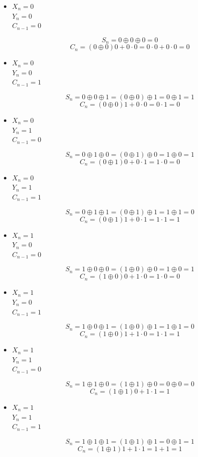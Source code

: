 \documentclass{article}
\begin{document}
\begin{itemize}
	\item
	$X_n = 0$ \\
	$Y_n = 0$ \\
	$C_{n-1} = 0$

	\[S_n = 0 \oplus 0 \oplus 0 = 0\]
	\[C_n = (0 \oplus 0)0 + 0 \cdot 0 = 0 \cdot 0 + 0 \cdot 0 = 0\]

	\item
	$X_n = 0$ \\
	$Y_n = 0$ \\
	$C_{n-1} = 1$

	\[S_n = 0 \oplus 0 \oplus 1 = (0 \oplus 0) \oplus 1 = 0 \oplus 1 = 1\]
	\[C_n = (0 \oplus 0)1 + 0 \cdot 0 = 0 \cdot 1 = 0\]

	\item
	$X_n = 0$ \\
	$Y_n = 1$ \\
	$C_{n-1} = 0$

	\[S_n = 0 \oplus 1 \oplus 0 = (0 \oplus 1) \oplus 0 = 1 \oplus 0 = 1\]
	\[C_n = (0 \oplus 1)0 + 0 \cdot 1 = 1 \cdot 0 = 0\]

	\item
	$X_n = 0$ \\
	$Y_n = 1$ \\
	$C_{n-1} = 1$

	\[S_n = 0 \oplus 1 \oplus 1 = (0 \oplus 1) \oplus 1 = 1 \oplus 1 = 0\]
	\[C_n = (0 \oplus 1)1 + 0 \cdot 1 = 1 \cdot 1 = 1\]

	\item
	$X_n = 1$ \\
	$Y_n = 0$ \\
	$C_{n-1} = 0$

	\[S_n = 1 \oplus 0 \oplus 0 = (1 \oplus 0) \oplus 0 = 1 \oplus 0 = 1\]
	\[C_n = (1 \oplus 0)0 + 1 \cdot 0 = 1 \cdot 0 = 0\]

	\item
	$X_n = 1$ \\
	$Y_n = 0$ \\
	$C_{n-1} = 1$

	\[S_n = 1 \oplus 0 \oplus 1 = (1 \oplus 0) \oplus 1 = 1 \oplus 1 = 0\]
	\[C_n = (1 \oplus 0)1 + 1 \cdot 0 = 1 \cdot 1 = 1\]

	\item
	$X_n = 1$ \\
	$Y_n = 1$ \\
	$C_{n-1} = 0$

	\[S_n = 1 \oplus 1 \oplus 0 = (1 \oplus 1) \oplus 0 = 0 \oplus 0 = 0\]
	\[C_n = (1 \oplus 1)0 + 1 \cdot 1 = 1\]

	\item
	$X_n = 1$ \\
	$Y_n = 1$ \\
	$C_{n-1} = 1$

	\[S_n = 1 \oplus 1 \oplus 1 = (1 \oplus 1) \oplus 1 = 0 \oplus 1 = 1\]
	\[C_n = (1 \oplus 1)1 + 1 \cdot 1 = 1 + 1 = 1\]
\end{itemize}
\end{document}
